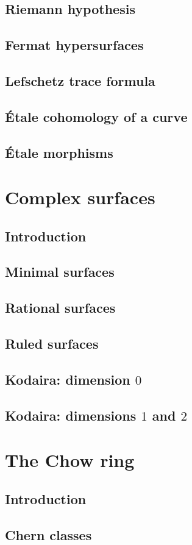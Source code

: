 \documentclass[11pt, oneside,margin=1in]{article}
\begin{document}
\subsection{Riemann hypothesis}
\subsection{Fermat hypersurfaces}
\subsection{Lefschetz trace formula}
\subsection{\'Etale cohomology of a curve}
\subsection{\'Etale morphisms}
\section{Complex surfaces}
\subsection{Introduction}
\subsection{Minimal surfaces}
\subsection{Rational surfaces}
\subsection{Ruled surfaces}
\subsection{Kodaira: dimension $0$}
\subsection{Kodaira: dimensions $1$ and $2$}
\section{The Chow ring}
\subsection{Introduction}
\subsection{Chern classes}
\printindex
\end{document}
